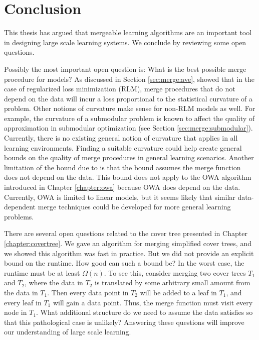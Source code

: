 \documentclass[thesis.tex]{subfiles}
\begin{document}
\chapter{Conclusion}
\label{chapter:conclusion}

\noindent
This thesis has argued that mergeable learning algorithms are an important tool in designing large scale learning systems.
We conclude by reviewing some open questions. 

Possibly the most important open question is:
What is the best possible merge procedure for models?
As discussed in Section \ref{sec:merge:ave}, 
\citet{liu2014distributed} showed that in the case of regularized loss minimization (RLM),
merge procedures that do not depend on the data will incur a loss proportional to the statistical curvature of a problem.
Other notions of curvature make sense for non-RLM models as well.
For example, the curvature of a submodular problem is known to affect the quality of approximation in submodular optimization (see Section \ref{sec:merge:submodular}).
Currently, there is no existing general notion of curvature that applies in all learning environments.
Finding a suitable curvature could help create general bounds on the quality of merge procedures in general learning scenarios.
Another limitation of the bound due to \citet{liu2014distributed} is that the bound assumes the merge function does not depend on the data.
This bound does not apply to the OWA algorithm introduced in Chapter \ref{chapter:owa}
because OWA does depend on the data.
Currently, OWA is limited to linear models,
but it seems likely that similar data-dependent merge techniques could be developed for more general learning problems.

There are several open questions related to the cover tree presented in Chapter \ref{chapter:covertree}.
We gave an algorithm for merging simplified cover trees,
and we showed this algorithm was fast in practice.
But we did not provide an explicit bound on the runtime.
How good can such a bound be?
In the worst case, the runtime must be at least $\Omega(n)$.
To see this, consider merging two cover trees $T_1$ and $T_2$,
where the data in $T_2$ is translated by some arbitrary small amount from the data in $T_1$.
Then every data point in $T_2$ will be added to a leaf in $T_1$, 
and every leaf in $T_1$ will gain a data point.
Thus, the merge function must visit every node in $T_1$.
What additional structure do we need to assume the data satisfies so that this pathological case is unlikely?
Answering these questions will improve our understanding of large scale learning.
\end{document}
